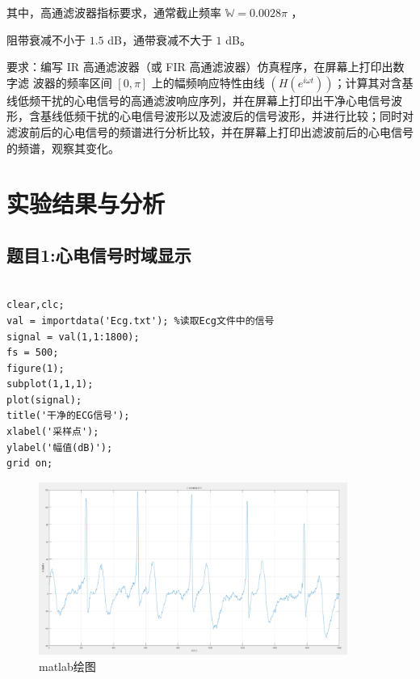 \documentclass[12pt,hyperref,a4paper,UTF8]{ctexart}
\begin{document}
其中，高通滤波器指标要求，通常截止频率 \(\mathbb{W} = 0.0028 \pi\) ，

阻带衰减不小于 \(1.5\) dB，通带衰减不大于 \(1\) dB。

要求：编写 IR 高通滤波器（或 FIR 高通滤波器）仿真程序，在屏幕上打印出数字滤
波器的频率区间 \([0, \pi]\) 上的幅频响应特性由线 \(\left(H(e^{i\omega t})\right)\)；计算其对含基线低频干扰的心电信号的高通滤波响应序列，并在屏幕上打印出干净心电信号波形，含基线低频干扰的心电信号波形以及滤波后的信号波形，并进行比较；同时对滤波前后的心电信号的频谱进行分析比较，并在屏幕上打印出滤波前后的心电信号的频谱，观察其变化。

\section{实验结果与分析}

\subsection{题目1:心电信号时域显示}

\begin{lstlisting}[style=matlab, caption={实验一MATLAB实现代码}]

clear,clc;
val = importdata('Ecg.txt'); %读取Ecg文件中的信号
signal = val(1,1:1800);
fs = 500;
figure(1);
subplot(1,1,1);
plot(signal);
title('干净的ECG信号');
xlabel('采样点');
ylabel('幅值(dB)');
grid on;

\end{lstlisting}




\begin{figure}[H] %
        \centering
        \includegraphics[width=0.9\textwidth]{figures/1.png} %
        \caption{matlab绘图} %
        \label{fig:example} %
\end{figure}
\end{document}
